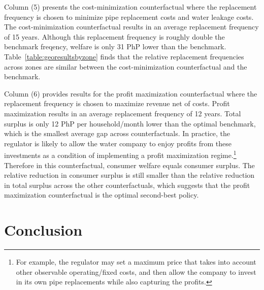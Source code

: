 \documentclass[12pt,table]{article}
\begin{document}
Column (5) presents the cost-minimization counterfactual where the replacement frequency is chosen to minimize pipe replacement costs and water leakage costs.  The cost-minimization counterfactual results in an average replacement frequency of 15 years.  Although this replacement frequency is roughly double the benchmark freqency, welfare is only 31 PhP lower than the benchmark.  Table~\ref{table:georesultsbyzone} finds that the relative replacement frequencies across zones are similar between the cost-minimization counterfactual and the benchmark.  

Column (6) provides results for the profit maximization counterfactual where the replacement frequency is chosen to maximize revenue net of costs.  Profit maximization results in an average replacement frequency of 12 years.  Total surplus is only 12 PhP per household/month lower than the optimal benchmark, which is the smallest average gap across counterfactuals.  In practice, the regulator is likely to allow the water company to enjoy profits from these investments as a condition of implementing a profit maximization regime.\footnote{For example, the regulator may set a maximum price that takes into account other observable operating/fixed costs, and then allow the company to invest in its own pipe replacements while also capturing the profits.}  Therefore in this counterfactual, consumer welfare equals consumer surplus.  The relative reduction in consumer surplus is still smaller than the relative reduction in total surplus across the other counterfactuals, which suggests that the profit maximization counterfactual is the optimal second-best policy.


\section{Conclusion}\label{section:conclusion}







\end{document}
